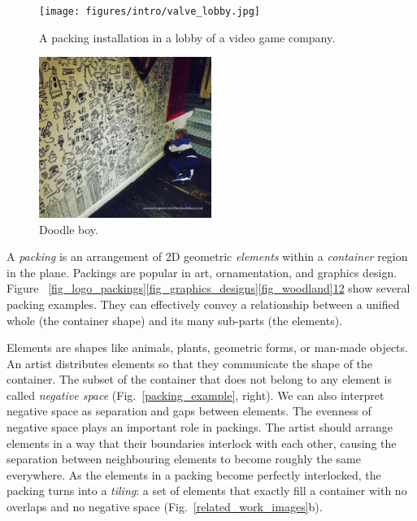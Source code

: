 \begin{figure}
\centering
\texttt{[image: figures/intro/valve\_lobby.jpg]} 
\caption{\label{fig_valve_lobby} 
A packing installation in a lobby of a video game company. }
\end{figure}

\begin{figure}
\centering
\includegraphics[width=0.5\textwidth]{figures/intro/doodle_boy.pdf} 
\caption{\label{fig_doodle_boy} 
Doodle boy. }
\end{figure}



A \textit{packing} is an arrangement of 2D geometric
\textit{elements} within a \textit{container} region in the plane.
Packings are popular in art, ornamentation, and graphics design.
Figure ~\ref{fig_logo_packings}\ref{fig_graphics_designs}\ref{fig_woodland}\ref{fig_valve_lobby}\ref{fig_doodle_boy} show several packing examples.
They can effectively convey a relationship between a unified whole (the
container shape) and its many sub-parts (the elements).

Elements are shapes like animals,
plants, geometric forms, or man-made objects.
An artist distributes elements so that they communicate
the shape of the container. 
The subset of the container that does not belong to any element is
called \textit{negative space}
(Fig.~\ref{packing_example}, right).
We can also interpret negative space as separation and gaps between elements.
The evenness of negative space plays an important role in 
packings.  
The artist should arrange elements in a way that their boundaries interlock with each other,
causing the separation between neighbouring elements to become roughly the same everywhere.
As the elements in a packing become perfectly interlocked,
the packing turns into a \textit{tiling}: a set of elements that exactly
fill a container with no overlaps and no negative space (Fig.~\ref{related_work_images}b).

